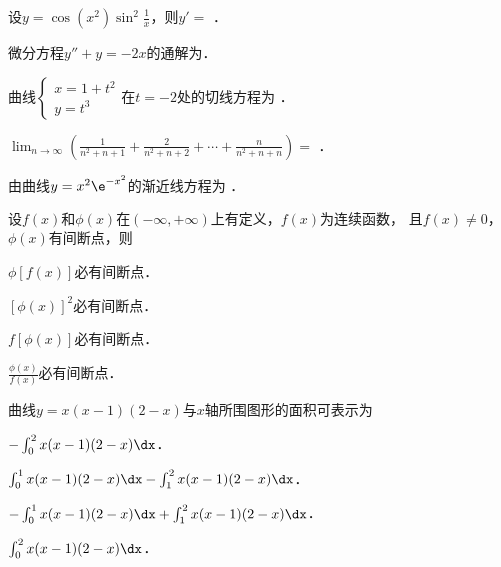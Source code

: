 \documentclass[plain,noanswer,medmath]{../../template/jnuexam}
\begin{document}






\begin{problem}
设$y = \cos(x^2)\sin^2\frac{1}{x}$，则$y' =$ \fillin{}．
\end{problem}


\begin{problem}
微分方程$y'' + y = - 2x$的通解为\fillin{}．
\end{problem}


\begin{problem}
曲线$\begin{cases}
  x = 1 + t^2 \\
  y = t^3
\end{cases}$在$t = - 2$处的切线方程为 \fillin{}．
\end{problem}


\begin{problem}
$\lim_{n \to \infty} \left(\frac{1}{n^2 + n + 1} + \frac{2}{n^2 + n + 2}
+ \cdots + \frac{n}{n^2 + n + n} \right) =$ \fillin{}．
\end{problem}


\begin{problem}
由曲线$y = x^2\e^{- x^2}$的渐近线方程为 \fillin{}．
\end{problem}




\begin{problem}
设$f(x)$和$\phi (x)$在$(-\infty, +\infty)$上有定义，$f(x)$为连续函数，
且$f(x) \ne 0$，$\phi (x)$有间断点，则\pickout{}
\begin{abcd}
\item $\phi [f(x)]$必有间断点．		
\item $[\phi(x)]^2$必有间断点．
\item $f[\phi(x)]$必有间断点．		
\item $\frac{\phi(x)}{f(x)}$必有间断点．
\end{abcd}
\end{problem}


\begin{problem}
曲线$y = x(x - 1)(2 - x)$与$x$轴所围图形的面积可表示为\pickout{}
\begin{abcd}
\item $- \int_0^2x(x - 1)(2 - x)\dx$．
\item $\int_0^1x(x - 1)(2 - x)\dx - \int_1^2x(x - 1)(2 - x)\dx$．
\item $- \int_0^1x(x - 1)(2 - x)\dx + \int_1^2x(x - 1)(2 - x)\dx$．
\item $\int_0^2x(x - 1)(2 - x)\dx$．
\end{abcd}
\end{problem}
\end{document}
